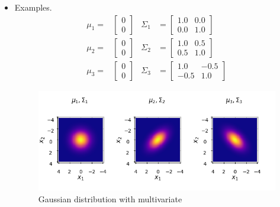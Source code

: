 \begin{itemize}
    \item Examples.
    \begin{equation}
        \begin{array}{llll}
        \mu_1 = &\left[\begin{array}{c} 0 \\ 0 \end{array}\right] & \Sigma_1 &= \left[\begin{array}{cc} 1.0 &  0.0 \\  0.0 & 1.0 \end{array}\right] \\
        \mu_2 = &\left[\begin{array}{c} 0 \\ 0 \end{array}\right] & \Sigma_2 &= \left[\begin{array}{cc} 1.0 &  0.5 \\  0.5 & 1.0 \end{array}\right] \\
        \mu_3 = &\left[\begin{array}{c} 0 \\ 0 \end{array}\right] & \Sigma_3 &= \left[\begin{array}{cc} 1.0 & -0.5 \\ -0.5 & 1.0 \end{array}\right]
        \end{array}
    \end{equation}
    \begin{figure}[!htbp]
        \centering
        \includegraphics[width=6.2in]{./images/gaussianDistributionMultivariate.png}
        \caption{Gaussian distribution with multivariate}
    \end{figure}

\end{itemize}

    
